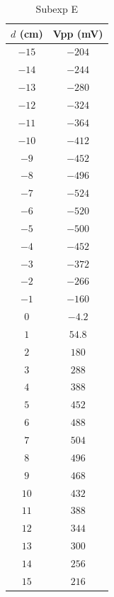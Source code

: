 \begin{table}[htb!]
\centering
\caption{Subexp E}
\begin{tabular}{cc}
\toprule
$d$ (\unit{\cm}) & Vpp (\unit{\mV}) \\
\midrule
$-15$ & $-204$ \\
$-14$ & $-244$ \\
$-13$ & $-280$ \\
$-12$ & $-324$ \\
$-11$ & $-364$ \\
$-10$ & $-412$ \\
$-9$ & $-452$ \\
$-8$ & $-496$ \\
$-7$ & $-524$ \\
$-6$ & $-520$ \\
$-5$ & $-500$ \\
$-4$ & $-452$ \\
$-3$ & $-372$ \\
$-2$ & $-266$ \\
$-1$ & $-160$ \\
$0$ & $-4.2$ \\
$1$ & $54.8$ \\
$2$ & $180$ \\
$3$ & $288$ \\
$4$ & $388$ \\
$5$ & $452$ \\
$6$ & $488$ \\
$7$ & $504$ \\
$8$ & $496$ \\
$9$ & $468$ \\
$10$ & $432$ \\
$11$ & $388$ \\
$12$ & $344$ \\
$13$ & $300$ \\
$14$ & $256$ \\
$15$ & $216$ \\
\bottomrule
\end{tabular}
\end{table}

